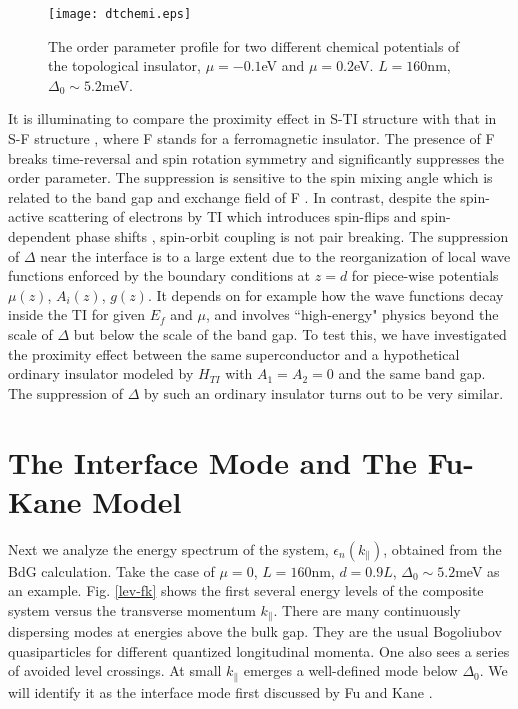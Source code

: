 \documentclass[11pt]{report}
\begin{document}
\begin{figure}
\texttt{[image: dtchemi.eps]}
\caption{The order parameter profile for two different chemical potentials of
the topological insulator, $\mu=-0.1$eV and $\mu=0.2$eV. $L=160$nm,  
$\Delta_0\sim 5.2$meV. }\label{delta-chem}
\end{figure}

It is illuminating to compare the proximity effect in S-TI
structure with that in S-F structure \cite{toku}, where F stands for 
a ferromagnetic insulator. 
The presence of F breaks time-reversal and spin rotation symmetry and 
significantly suppresses the order parameter. The suppression is
sensitive to the spin mixing angle which is related to the band gap
and exchange field of F \cite{toku}.
In contrast, despite the spin-active scattering of electrons 
by TI which introduces spin-flips and spin-dependent phase shifts \cite{zhao}, 
spin-orbit coupling is not pair breaking.
%
The suppression of $\Delta$ near the interface is to a large extent 
due to the reorganization of local wave functions enforced by the boundary conditions 
at $z=d$ for piece-wise potentials $\mu(z)$, $A_i(z)$, $g(z)$. 
It depends on for example how the wave functions decay inside the TI
for given $E_f$ and $\mu$, and involves ``high-energy" physics beyond the
scale of $\Delta$ but below the scale of the band gap. 
%
To test this, we have investigated the proximity effect between the same
superconductor and
a hypothetical ordinary insulator modeled by $H_{TI}$ with $A_1=A_2=0$
and the same band gap. The suppression of $\Delta$ by such an 
ordinary insulator turns out to be very similar. 

\section{The Interface Mode and The Fu-Kane Model}

Next we analyze the energy spectrum of the system, $\epsilon_n(k_\parallel)$,
obtained from the BdG calculation. 
Take the case of $\mu=0$, $L=160$nm, $d=0.9L$, $\Delta_0\sim 5.2$meV as an example.
Fig. \ref{lev-fk} shows the first several energy levels of the composite
system versus the transverse momentum $k_\parallel$. There are many continuously
dispersing modes at energies above the bulk gap. They are the usual Bogoliubov
quasiparticles for different quantized longitudinal momenta.
One also sees a series of avoided level crossings.
At small $k_\parallel$ emerges a well-defined mode below $\Delta_0$. We will 
identify it as the interface mode first discussed by Fu and Kane \cite{f-k}.
\end{document}
